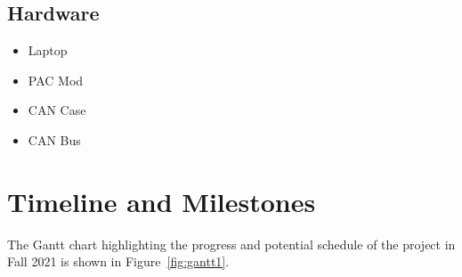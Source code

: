 \documentclass[letterpaper,12pt]{article}   %
\begin{document}
	\subsection{Hardware} 
	\begin{itemize}
    \item Laptop
    \item PAC Mod 
    \item CAN Case 
    \item CAN Bus 
 \end{itemize}

\section{Timeline and Milestones} \label{sec:timeline}


The Gantt chart highlighting the progress and potential schedule of the project in Fall 2021 is shown in Figure~\ref{fig:gantt1}.  
\end{document}
